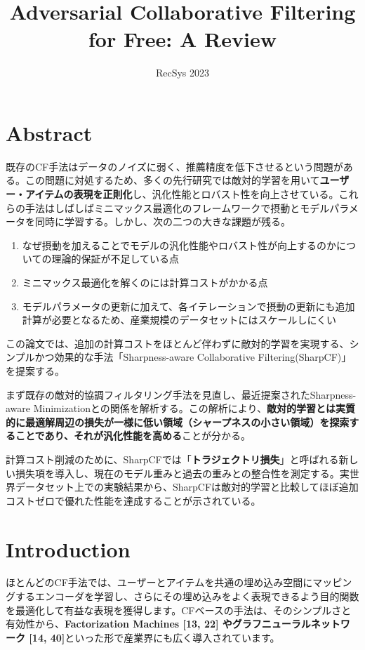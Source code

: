 \documentclass[11pt,a4paper]{article}
\title{Adversarial Collaborative Filtering for Free: A Review}
\author{RecSys 2023}
\date{}
\begin{document}
\maketitle

\section{Abstract}

既存のCF手法はデータのノイズに弱く、推薦精度を低下させるという問題がある。この問題に対処するため、多くの先行研究では敵対的学習を用いて\textbf{ユーザー・アイテムの表現を正則化}し、汎化性能とロバスト性を向上させている。これらの手法はしばしばミニマックス最適化のフレームワークで摂動とモデルパラメータを同時に学習する。しかし、次の二つの大きな課題が残る。

\begin{enumerate}
    \item なぜ摂動を加えることでモデルの汎化性能やロバスト性が向上するのかについての理論的保証が不足している点
    \item ミニマックス最適化を解くのには計算コストがかかる点
    \item モデルパラメータの更新に加えて、各イテレーションで摂動の更新にも追加計算が必要となるため、産業規模のデータセットにはスケールしにくい
\end{enumerate}

この論文では、追加の計算コストをほとんど伴わずに敵対的学習を実現する、シンプルかつ効果的な手法「Sharpness-aware Collaborative Filtering(SharpCF)」を提案する。

まず既存の敵対的協調フィルタリング手法を見直し、最近提案されたSharpness-aware Minimizationとの関係を解析する。この解析により、\textbf{敵対的学習とは実質的に最適解周辺の損失が一様に低い領域（シャープネスの小さい領域）を探索することであり、それが汎化性能を高める}ことが分かる。

計算コスト削減のために、SharpCFでは「\textbf{トラジェクトリ損失}」と呼ばれる新しい損失項を導入し、現在のモデル重みと過去の重みとの整合性を測定する。実世界データセット上での実験結果から、SharpCFは敵対的学習と比較してほぼ追加コストゼロで優れた性能を達成することが示されている。

\section{Introduction}

ほとんどのCF手法では、ユーザーとアイテムを共通の埋め込み空間にマッピングするエンコーダを学習し、さらにその埋め込みをよく表現できるよう目的関数を最適化して有益な表現を獲得します。CFベースの手法は、そのシンプルさと有効性から、\textbf{Factorization Machines [13, 22] やグラフニューラルネットワーク [14, 40]}といった形で産業界にも広く導入されています。
\end{document}
